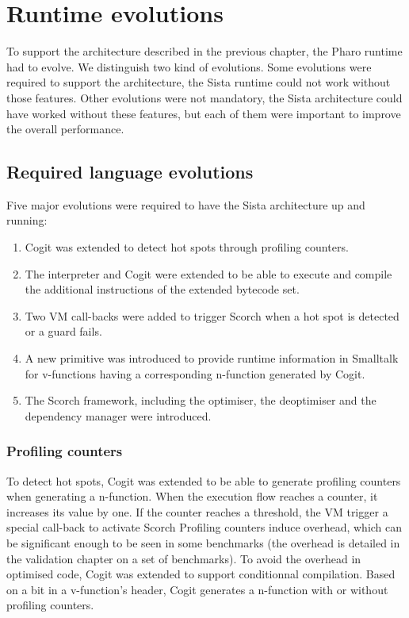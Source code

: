 \documentclass[a4paper,12pt,twoside]{../includes/ThesisStyle}
\begin{document}
\fi

\chapter{Runtime evolutions}
\label{chap:runtimeEvolution}
\minitoc

To support the architecture described in the previous chapter, the Pharo runtime had to evolve. We distinguish two kind of evolutions. Some evolutions were required to support the architecture, the Sista runtime could not work without those features. Other evolutions were not mandatory, the Sista architecture could have worked without these features, but each of them were important to improve the overall performance.


\section{Required language evolutions}

Five major evolutions were required to have the Sista architecture up and running:
\begin{enumerate}
	\item Cogit was extended to detect hot spots through profiling counters.
	\item The interpreter and Cogit were extended to be able to execute and compile the additional instructions of the extended bytecode set.
	\item Two VM call-backs were added to trigger Scorch when a hot spot is detected or a guard fails.
	\item A new primitive was introduced to provide runtime information in Smalltalk for v-functions having a corresponding n-function generated by Cogit.
	\item The Scorch framework, including the optimiser, the deoptimiser and the dependency manager were introduced.
\end{enumerate}

\subsection{Profiling counters}

To detect hot spots, Cogit was extended to be able to generate profiling counters when generating a n-function. When the execution flow reaches a counter, it increases its value by one. If the counter reaches a threshold, the VM trigger a special call-back to activate Scorch Profiling counters induce overhead, which can be significant enough to be seen in some benchmarks (the overhead is detailed in the validation chapter on a set of benchmarks). To avoid the overhead in optimised code, Cogit was extended to support conditionnal compilation. Based on a bit in a v-function's header, Cogit generates a n-function with or without profiling counters. 
\end{document}
